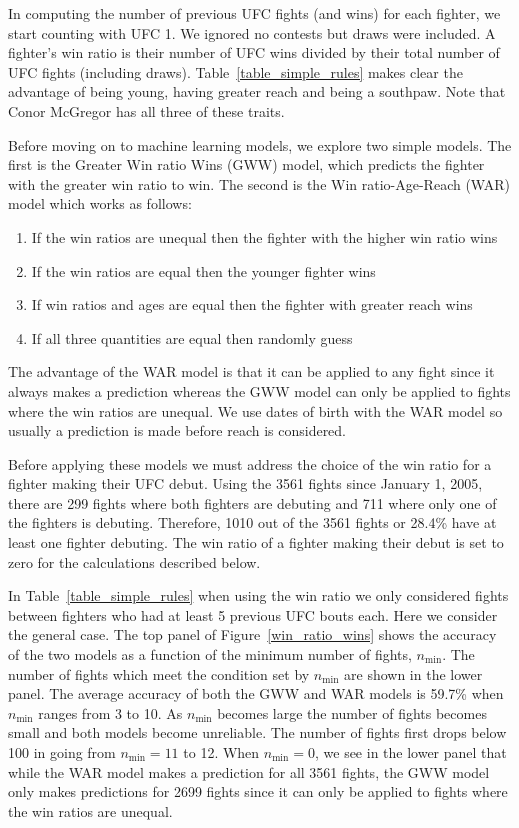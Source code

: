 In computing the number of previous UFC fights (and wins) for each fighter, we start
counting with UFC 1. We ignored no contests but draws were included. A fighter's
win ratio is their number of UFC wins divided by their
total number of UFC fights (including draws).
Table~\ref{table_simple_rules} makes clear the advantage of being young, having
greater reach and being a southpaw. Note that Conor McGregor has all three of
these traits.

Before moving on to machine learning models, we explore two simple
models. The first is the Greater Win ratio Wins (GWW) model,
which predicts the fighter with the greater win ratio to win. The
second is the Win ratio-Age-Reach (WAR) model which works as follows:

\begin{enumerate}[noitemsep]
\item If the win ratios are unequal then the fighter with the higher win ratio wins
\item If the win ratios are equal then the younger fighter wins
\item If win ratios and ages are equal then the fighter with greater reach wins
\item If all three quantities are equal then randomly guess
\end{enumerate}

\noindent
The advantage of the WAR model is that it can be applied to any fight
since it always makes a prediction whereas the GWW model can only be applied
to fights where the win ratios are unequal. We use dates of birth with the
WAR model so usually a prediction is made before reach is considered.

Before applying these models we must address the choice of the win
ratio for a fighter making their UFC debut.
Using the 3561 fights since January 1, 2005, there are
299 fights where both fighters are debuting and 711 where only one
of the fighters is debuting. Therefore, 1010 out of the 3561 fights or
28.4\% have at least one fighter debuting.
The win ratio of a fighter making their debut is
set to zero for the calculations described below.

In Table~\ref{table_simple_rules} when using the win ratio we only
considered fights between fighters who had at least 5 previous UFC bouts each.
Here we consider the general case.
The top panel of Figure~\ref{win_ratio_wins} shows the accuracy
of the two models as a
function of the minimum number of fights, $n_{\textrm{min}}$.
The number of fights which meet the condition
set by $n_{\textrm{min}}$ are shown in the
lower panel.
The average accuracy of both the GWW and WAR models is 59.7\% when
$n_{\textrm{min}}$ ranges from 3 to 10. As $n_{\textrm{min}}$ becomes
large the number of fights becomes small and both models
become unreliable. The number of fights first drops below 100 in
going from $n_{\textrm{min}}=11$ to 12. When $n_{\textrm{min}}=0$,
we see in the lower panel that while the WAR model makes
a prediction for all 3561 fights, the GWW model only makes predictions for 2699 fights
since it can only be applied to fights where the win ratios are unequal.


